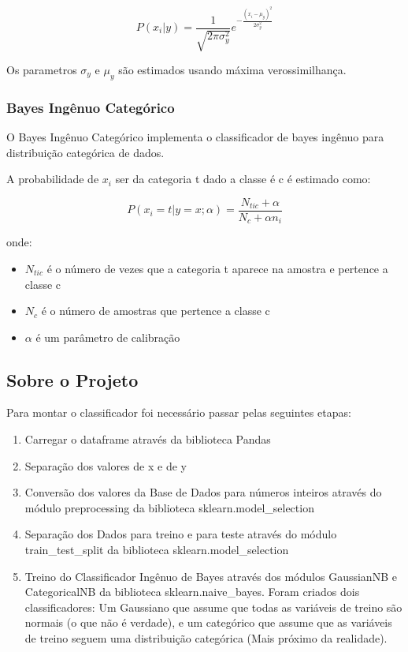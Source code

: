 \documentclass[conference]{IEEEtran}
\begin{document}
\begin{equation}
    P(x_i|y) = \frac{1}{\sqrt{2\pi\sigma_y^2}}e^{-\frac{(x_i - \mu_y)^2}{2\sigma_y^2}}
\end{equation}

Os parametros $\sigma_y$ e $\mu_y$ são estimados usando máxima verossimilhança.


\subsubsection{Bayes Ingênuo Categórico}
O Bayes Ingênuo Categórico implementa o classificador de bayes ingênuo para distribuição categórica de dados.

A probabilidade de $x_i$ ser da categoria t dado a classe é c é estimado como:

\begin{equation}
    P(x_i = t | y = x; \alpha) = \frac{N_{tic} + \alpha}{N_c + \alpha n_i}
\end{equation}

onde:

\begin{itemize}
\item $N_{tic}$ é o número de vezes que a categoria t aparece na amostra e pertence a classe c
\item $N_c$ é o número de amostras que pertence a classe c
\item $\alpha$ é um parâmetro de calibração
\end{itemize}

\subsection{Sobre o Projeto}
Para montar o classificador foi necessário passar  pelas seguintes etapas:

\begin{enumerate}
\item Carregar o dataframe através da biblioteca Pandas
\item Separação dos valores de x e de y
\item Conversão dos valores da Base de Dados para números inteiros através do módulo preprocessing da biblioteca sklearn.model\_selection
\item Separação dos Dados para treino e para teste através do módulo train\_test\_split da biblioteca sklearn.model\_selection
\item Treino do Classificador Ingênuo de Bayes através dos módulos GaussianNB e CategoricalNB da biblioteca sklearn.naive\_bayes. Foram criados dois classificadores: Um Gaussiano que assume que todas as variáveis de treino são normais (o que não é verdade), e um categórico que assume que as variáveis de treino seguem uma distribuição categórica (Mais próximo da realidade).
\end{enumerate}
\end{document}

